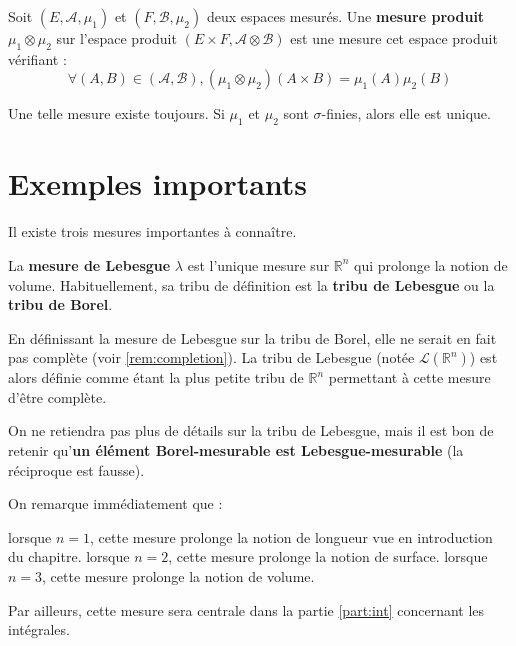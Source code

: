 \documentclass[../integ-proba.tex]{subfiles}
\begin{document}
  \begin{defi}
    Soit $\left(E, \mathcal{A}, \mu_1\right)$ et $\left(F, \mathcal{B}, \mu_2\right)$ deux espaces mesurés.
    Une \textbf{mesure produit} $\mu_1 \otimes \mu_2$ sur l'espace produit $\left(E \times F, \mathcal{A} \otimes \mathcal{B}\right)$ est une mesure cet espace produit vérifiant :
    $$
    \forall \left(A, B\right) \in \left(\mathcal{A}, \mathcal{B}\right), (\mu_1 \otimes \mu_2)(A \times B) = \mu_1(A)\mu_2(B)
    $$

    Une telle mesure existe toujours.
    Si $\mu_1$ et $\mu_2$ sont $\sigma$-finies, alors elle est unique.
  \end{defi}


  \section{Exemples importants}
  Il existe trois mesures importantes à connaître.

  \begin{defi}
    La \textbf{mesure de Lebesgue} $\lambda$ est l'unique mesure sur $\mathbb{R}^n$ qui prolonge la notion de volume.
    Habituellement, sa tribu de définition est la \textbf{tribu de Lebesgue} ou la \textbf{tribu de Borel}.
  \end{defi}

  \begin{rem}
    En définissant la mesure de Lebesgue sur la tribu de Borel, elle ne serait en fait pas complète (voir \ref{rem:completion}).
    La tribu de Lebesgue (notée $\mathcal{L}(\mathbb{R}^n)$) est alors définie comme étant la plus petite tribu de $\mathbb{R}^n$ permettant à cette mesure d'être complète.

    On ne retiendra pas plus de détails sur la tribu de Lebesgue, mais il est bon de retenir qu'\textbf{un élément Borel-mesurable est Lebesgue-mesurable} (la réciproque est fausse).
  \end{rem}

  \begin{rem}
    On remarque immédiatement que :
    \begin{itemize}
      \itemb lorsque $n=1$, cette mesure prolonge la notion de longueur vue en introduction du chapitre.
      \itemb lorsque $n=2$, cette mesure prolonge la notion de surface.
      \itemb lorsque $n=3$, cette mesure prolonge la notion de volume.
    \end{itemize}

    Par ailleurs, cette mesure sera centrale dans la partie \ref{part:int} concernant les intégrales.
  \end{rem}
\end{document}

